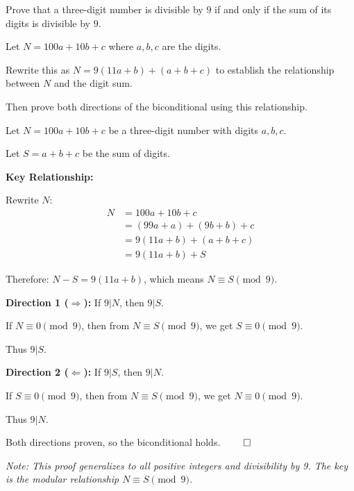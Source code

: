 
\begin{problem}
Prove that a three-digit number is divisible by $9$ if and only if the sum of its digits is divisible by $9$.
\end{problem}

\begin{hint}
Let $N = 100a + 10b + c$ where $a, b, c$ are the digits.

Rewrite this as $N = 9(11a + b) + (a + b + c)$ to establish the relationship between $N$ and the digit sum.

Then prove both directions of the biconditional using this relationship.
\end{hint}

\begin{solution}
Let $N = 100a + 10b + c$ be a three-digit number with digits $a, b, c$.

Let $S = a + b + c$ be the sum of digits.

\vspace{0.3cm}

\textbf{Key Relationship:}

Rewrite $N$:
\begin{align*}
N &= 100a + 10b + c \\
&= (99a + a) + (9b + b) + c \\
&= 9(11a + b) + (a + b + c) \\
&= 9(11a + b) + S
\end{align*}

Therefore: $N - S = 9(11a + b)$, which means $N \equiv S \pmod{9}$.

\vspace{0.3cm}

\textbf{Direction 1 ($\Rightarrow$):} If $9|N$, then $9|S$.

If $N \equiv 0 \pmod{9}$, then from $N \equiv S \pmod{9}$, we get $S \equiv 0 \pmod{9}$.

Thus $9|S$.

\vspace{0.3cm}

\textbf{Direction 2 ($\Leftarrow$):} If $9|S$, then $9|N$.

If $S \equiv 0 \pmod{9}$, then from $N \equiv S \pmod{9}$, we get $N \equiv 0 \pmod{9}$.

Thus $9|N$.

\vspace{0.3cm}

Both directions proven, so the biconditional holds. $\qed$

\vspace{0.3cm}

\textit{Note: This proof generalizes to all positive integers and divisibility by 9. The key is the modular relationship $N \equiv S \pmod{9}$.}
\end{solution}

